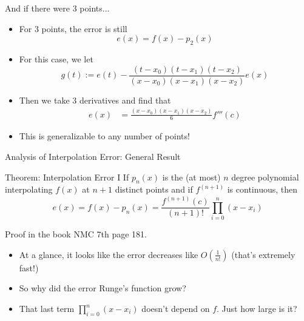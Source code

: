 \documentclass[10pt]{beamer}
\begin{document}
\begin{frame}{And if there were 3 points...}

\begin{itemize}
\item For 3 points, the error is still
\begin{equation*}
  e(x) = f(x) - p_2(x)
\end{equation*}

  \item For this case, we let 
\begin{equation*}
  g(t) := e(t) - \frac{(t-x_0)(t-x_1)(t-x_2)}{(x-x_0)(x-x_1)(x-x_2)}e(x)
\end{equation*}
  \item Then we take 3 derivatives and find that
\begin{align*}
  e(x) &= \frac{(x-x_0)(x-x_1)(x-x_2)}{6} f'''(c)
\end{align*}
\item<2> This is generalizable to any number of points!
\end{itemize}
\end{frame}

\begin{frame}{Analysis of Interpolation Error: General Result}
\vspace{-0.5cm}
\begin{block}{Theorem: Interpolation Error I}
  If $p_n(x)$ is the (at most) $n$ degree polynomial interpolating $f(x)$ at
$n+1$ distinct points and if $f^{(n+1)}$ is continuous, then 
\begin{equation*}
  e(x) = f(x) - p_n(x) = \frac{f^{(n+1)}(c)}{(n+1)!}  \prod_{i=0}^{n}(x-x_i)
\end{equation*}
\end{block}
Proof in the book NMC 7th page 181.

\vspace{4ex}
\begin{itemize}
    \item At a glance, it looks like the error decreases like $O(\frac{1}{n!})$ (that's extremely fast!)
    \item So why did the error Runge's function grow? 
    \item That last term $\prod_{i=0}^{n}(x-x_i)$ doesn't depend on $f$. Just how large is it?
\end{itemize}
\end{frame}
\end{document}
